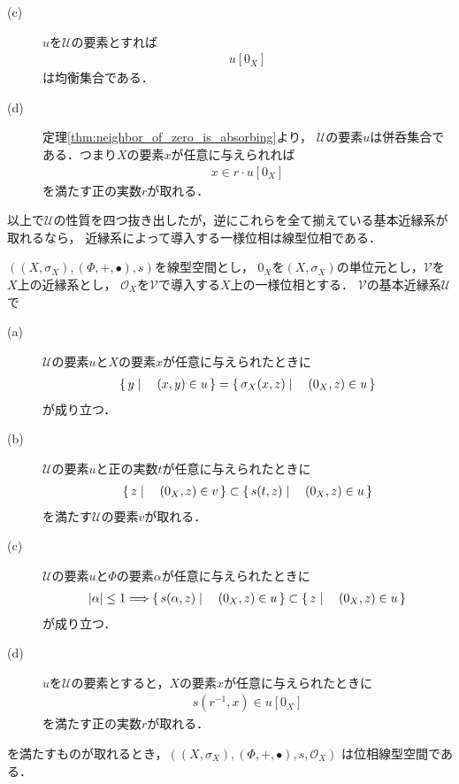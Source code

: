 \begin{description}
		\item[(c)] $u$を$\mathscr{U}$の要素とすれば
			\begin{align}
				u[0_X]
			\end{align}
			は均衡集合である．
			
		\item[(d)] 定理\ref{thm:neighbor_of_zero_is_absorbing}より，
			$\mathscr{U}$の要素$u$は併呑集合である．つまり$X$の要素$x$が任意に与えられれば
			\begin{align}
				x \in r \cdot u[0_X]
			\end{align}
			を満たす正の実数$r$が取れる．
	\end{description}
	
	以上で$\mathscr{U}$の性質を四つ抜き出したが，逆にこれらを全て揃えている基本近縁系が取れるなら，
	近縁系によって導入する一様位相は線型位相である．
	
	\begin{screen}
		\begin{thm}[線型位相を導入する近縁系]
		\label{thm:entourages_introducing_vector_topology}
			$\left(\left(X,\sigma_X\right),(\Phi,+,\bullet),s\right)$を線型空間とし，
			$0_X$を$\left(X,\sigma_X\right)$の単位元とし，$\mathscr{V}$を$X$上の近縁系とし，
			$\mathscr{O}_X$を$\mathscr{V}$で導入する$X$上の一様位相とする．
			$\mathscr{V}$の基本近縁系$\mathscr{U}$で
			\begin{description}
				\item[(a)] $\mathscr{U}$の要素$u$と$X$の要素$x$が任意に与えられたときに
					\begin{align}
						\left\{\, y \mid \quad (x,y) \in u\, \right\} = \left\{\, \sigma_X(x,z) \mid \quad (0_X,z) \in u\, \right\}
					\end{align}
					が成り立つ．
						
				\item[(b)] $\mathscr{U}$の要素$u$と正の実数$t$が任意に与えられたときに
					\begin{align}
						\left\{\, z \mid \quad (0_X,z) \in v\, \right\} \subset \left\{\, s(t,z) \mid \quad (0_X,z) \in u\, \right\}
					\end{align}
					を満たす$\mathscr{U}$の要素$v$が取れる．
					
				\item[(c)] $\mathscr{U}$の要素$u$と$\Phi$の要素$\alpha$が任意に与えられたときに
					\begin{align}
						|\alpha| \leq 1 \Longrightarrow \left\{\, s(\alpha,z) \mid \quad (0_X,z) \in u\, \right\} \subset \left\{\, z \mid \quad (0_X,z) \in u\, \right\}
					\end{align}
					が成り立つ．
					
				\item[(d)] $u$を$\mathscr{U}$の要素とすると，$X$の要素$x$が任意に与えられたときに
					\begin{align}
						s\left(r^{-1},x\right) \in u[0_X]
					\end{align}
					を満たす正の実数$r$が取れる．
			\end{description}
			を満たすものが取れるとき，$\left(\left(X,\sigma_X\right),(\Phi,+,\bullet),s,\mathscr{O}_X\right)$
			は位相線型空間である．
		\end{thm}
	\end{screen}
	

